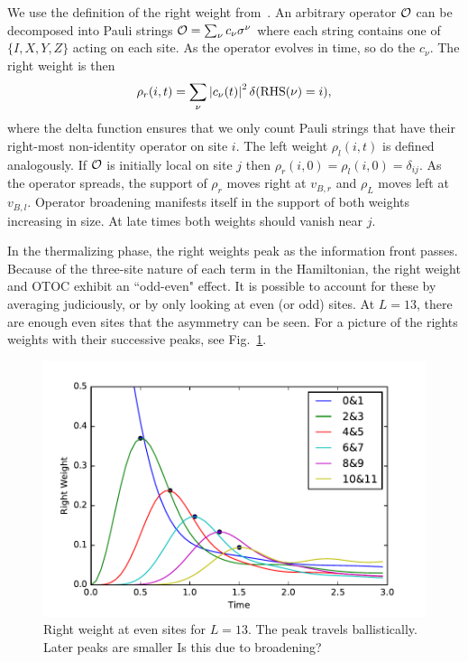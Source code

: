 \documentclass[aps,prx,reprint,superscriptaddress, longbibliography]{revtex4-1}
\newcommand{\charlie}[1]{ {\color{Magenta} {{#1}}}}
\begin{document}
We use the definition of the right weight from~\cite{KeyserlingkHydro2017}. An arbitrary operator $\cal O$ can be decomposed into Pauli strings ${\cal O} = \sum_\nu c_\nu \sigma^\nu$ where each string contains one of $\{I, X, Y, Z\}$ acting on each site. As the operator evolves in time, so do the $c_\nu$. The right weight is then
\begin{align}
\rho_r(i,t) = \sum_\nu\left| c_\nu(t)\right|^2\delta(\text{RHS}(\nu) = i),
\end{align}
where the delta function ensures that we only count Pauli strings that have their right-most non-identity operator on site $i$. The left weight $\rho_l(i,t)$ is defined analogously.  If $\cal O$ is initially local on site $j$ then $\rho_r(i,0) = \rho_l(i,0) = \delta_{ij}$. As the operator spreads, the support of $\rho_r$ moves right at $v_{B,r}$ and $\rho_L$ moves left at $v_{B,l}$. Operator broadening manifests itself in the support of both weights increasing in size. At late times both weights should vanish near $j$.

In the thermalizing phase, the right weights peak as the information front passes. Because of the three-site nature of each term in the Hamiltonian, the right weight and OTOC exhibit an ``odd-even" effect. It is possible to account for these by averaging judiciously, or by only looking at even (or odd) sites. At $L=13$, there are enough even sites that the asymmetry can be seen. For a picture of the rights weights with their successive peaks, see Fig.~\ref{fig:Rweightpeakshape}. 

\begin{figure}
	\includegraphics[width=\columnwidth]{Rweightpeakshape}
	\caption{Right weight at even sites for $L=13$. The peak travels ballistically. Later peaks are smaller \charlie{Is this due to broadening?}}
	\label{fig:Rweightpeakshape}
\end{figure}
\end{document}
